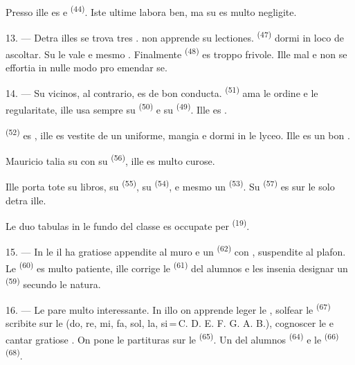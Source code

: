 Presso ille es  e  \textsuperscript{(44)}. Iste
ultime labora ben, ma su  es multo negligite.

13. --- Detra illes se trova tres .  non
apprende su lectiones.  \textsuperscript{(47)} dormi in loco de
ascoltar. Su  le vale  e mesmo
. Finalmente  \textsuperscript{(48)} es
troppo frivole. Ille  mal e non se effortia in nulle modo
pro emendar se.

14. --- Su vicinos, al contrario, es de bon conducta. 
\textsuperscript{(51)} ama le ordine e le regularitate, ille usa sempre su
 \textsuperscript{(50)} e su 
\textsuperscript{(49)}. Ille es .

 \textsuperscript{(52)} es , ille es vestite
de un uniforme, mangia e dormi in le lyceo. Ille es un bon .

Mauricio talia su  con su 
\textsuperscript{(56)}, ille es multo curose.

Ille porta tote su libros, su  \textsuperscript{(55)}, su
 \textsuperscript{(54)}, e mesmo un 
\textsuperscript{(53)}. Su  \textsuperscript{(57)} es
sur le solo detra ille.

Le duo tabulas in le fundo del classe es occupate per 
\textsuperscript{(19)}.

\VUsaut{4.6mm}
\VUsaut{3.4mm}

15. --- In le  il ha gratiose 
appendite al muro e un  \textsuperscript{(62)} con
, suspendite al plafon. Le 
\textsuperscript{(60)} es multo patiente, ille corrige le 
\textsuperscript{(61)} del alumnos e les insenia designar un 
\textsuperscript{(59)} secundo le natura.

16. --- Le  pare multo interessante. In illo on apprende
leger le , solfear le 
\textsuperscript{(67)} scribite sur le  (do, re, mi, fa,
sol, la, si\,=\,C. D. E. F. G. A. B.), cognoscer le  e cantar
gratiose . On pone le partituras sur le 
\textsuperscript{(65)}. Un del alumnos 
\textsuperscript{(64)} e le  \textsuperscript{(66)}
 \textsuperscript{(68)}.

